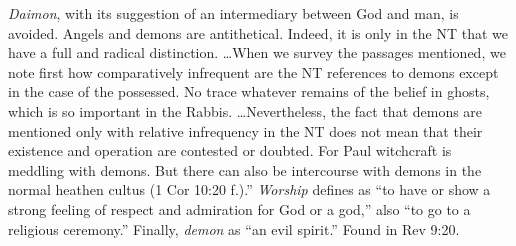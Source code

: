 \emph{Daimon}, with its suggestion of an intermediary between God and man, is avoided. Angels and demons are antithetical. Indeed, it is only in the NT that we have a full and radical distinction. \ldots When we survey the passages mentioned, we note first how comparatively infrequent are the NT references to demons except in the case of the possessed. No trace whatever remains of the belief in ghosts, which is so important in the Rabbis. \ldots Nevertheless, the fact that demons are mentioned only with relative infrequency in the NT does not mean that their existence and operation are contested or doubted. For Paul witchcraft is meddling with demons. But there can also be intercourse with demons in the normal heathen cultus (1 Cor 10:20 f.).'' \emph{Worship} defines as ``to have or show a strong feeling of respect and admiration for God or a god,'' also ``to go to a religious ceremony.'' Finally, \emph{demon} as ``an evil spirit.''
Found in Rev 9:20.
